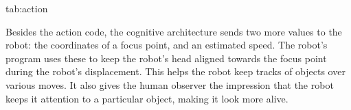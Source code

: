 \documentclass[pmlr]{jmlr}%
\begin{document}
\begin{table}[htbp]
	\floatconts
	{tab:action}
	{\caption{Actions available to the robot and their possible outcomes}}
	{%
		\qquad
	}
\end{table}

Besides the action code, the cognitive architecture sends two more values to the robot: the coordinates of a focus point, and an estimated speed. 
The robot's program uses these to keep the robot's head aligned towards the focus point during the robot's displacement. 
This helps the robot keep tracks of objects over various moves. 
It also gives the human observer the impression that the robot keeps it attention to a particular object, making it look more alive. 
\end{document}
